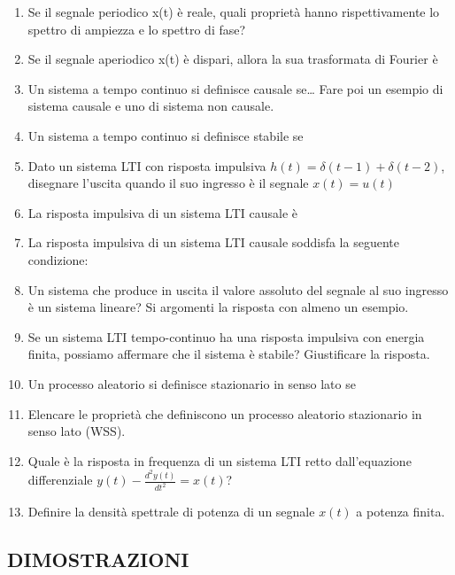 \documentclass[
]{article}
\begin{document}
\begin{enumerate}
\item
  Se il segnale periodico x(t) è reale, quali proprietà hanno
  rispettivamente lo spettro di ampiezza e lo spettro di fase?


\item
  Se il segnale aperiodico x(t) è dispari, allora la sua trasformata di
  Fourier è


\item
Un sistema a tempo continuo si definisce causale se\ldots{} Fare poi
un esempio di sistema causale e uno di sistema non causale.

\item
Un sistema a tempo continuo si definisce stabile se

\item
Dato un sistema LTI con risposta impulsiva $h(t) = \delta (t - 1) +\delta (t - 2)$,
disegnare l'uscita quando il suo ingresso è il segnale $x(t) = u(t)$  
\item 
La risposta impulsiva di un sistema LTI causale è
\item
La risposta impulsiva di un sistema LTI causale soddisfa la seguente
condizione:
\item
Un sistema che produce in uscita il valore assoluto del segnale al suo
ingresso è un sistema lineare? Si argomenti la risposta con almeno un
esempio.
\item
Se un sistema LTI tempo-continuo ha una risposta impulsiva con energia
finita, possiamo affermare che il sistema è stabile? Giustificare la
risposta.
\item
  Un processo aleatorio si definisce stazionario in senso lato se
\item
  Elencare le proprietà che definiscono un processo aleatorio
  stazionario in senso lato (WSS).
\item
Quale è la risposta in frequenza di un sistema LTI retto
dall'equazione differenziale $y(t) - \frac{d^{2}y(t)}{dt^2} = x(t)$?
\item
Definire la densità spettrale di potenza di un segnale \(x(t)\) a
potenza finita.
  
\end{enumerate}

\hypertarget{dimostrazioni}{%
\subsection{DIMOSTRAZIONI}\label{dimostrazioni}}
\end{document}
